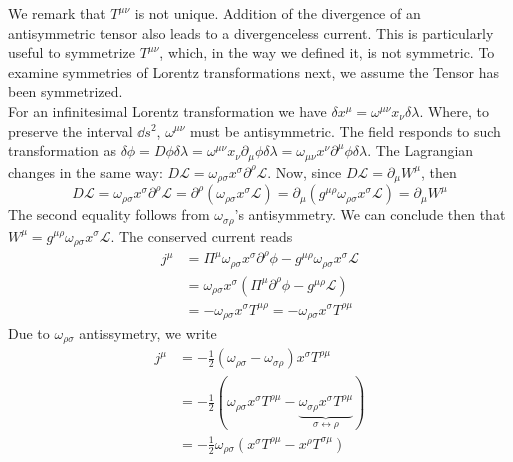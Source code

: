 We remark that $T^{\mu\nu}$ is not unique. Addition of the divergence of an antisymmetric tensor also leads to a divergenceless current. This is particularly useful to symmetrize $T^{\mu\nu}$, which, in the way we defined it, is not symmetric. To examine symmetries of Lorentz transformations next, we assume the Tensor has been symmetrized.\\

For an infinitesimal Lorentz transformation we have $\delta x^\mu=\omega^{\mu\nu}x_\nu\delta\lambda$. Where, to preserve the interval $\dd s^2$, $\omega^{\mu\nu}$ must be antisymmetric. The field responds to such transformation as $\delta\phi=D\phi\delta\lambda=\omega^{\mu\nu}x_\nu\partial_\mu\phi\delta\lambda=\omega_{\mu\nu}x^\nu\partial^\mu\phi\delta\lambda$. The Lagrangian changes in the same way: $D\mathcal{L}=\omega_{\rho\sigma}x^\sigma\partial^\rho\mathcal{L}$. Now, since $D\mathcal{L}=\partial_\mu W^\mu$, then
\begin{equation}
    D\mathcal{L}=\omega_{\rho\sigma}x^\sigma\partial^\rho\mathcal{L}=\partial^\rho(\omega_{\rho\sigma}x^\sigma\mathcal{L})=\partial_\mu(g^{\mu\rho}\omega_{\rho\sigma}x^\sigma\mathcal{L})=\partial_\mu W^\mu
\end{equation}
The second equality follows from $\omega_{\sigma\rho}$'s antisymmetry. We can conclude then that $W^\mu=g^{\mu\rho}\omega_{\rho\sigma}x^\sigma\mathcal{L}$. The conserved current reads
\begin{equation}
\begin{aligned}
       j^\mu&=\Pi^\mu\omega_{\rho\sigma}x^\sigma\partial^\rho\phi-g^{\mu\rho}\omega_{\rho\sigma}x^\sigma\mathcal{L}\\
       &=\omega_{\rho\sigma}x^\sigma(\Pi^\mu\partial^\rho\phi-g^{\mu\rho}\mathcal{L})\\
       &=-\omega_{\rho\sigma}x^\sigma T^{\mu\rho}=-\omega_{\rho\sigma}x^\sigma T^{\rho\mu}
\end{aligned}
 \end{equation}
 Due to $\omega_{\rho\sigma}$ antissymetry, we write
 \begin{equation}
\begin{aligned}
       j^\mu&=-\frac{1}{2}(\omega_{\rho\sigma}-\omega_{\sigma\rho})x^\sigma T^{\rho\mu}\\
       &=-\frac{1}{2}(\omega_{\rho\sigma}x^\sigma T^{\rho\mu}-\underbrace{\omega_{\sigma\rho}x^\sigma T^{\rho\mu}}_{\sigma\leftrightarrow\rho})\\
       &=-\frac{1}{2}\omega_{\rho\sigma}(x^{\sigma}T^{\rho\mu}-x^\rho T^{\sigma\mu})
\end{aligned}
 \end{equation}
